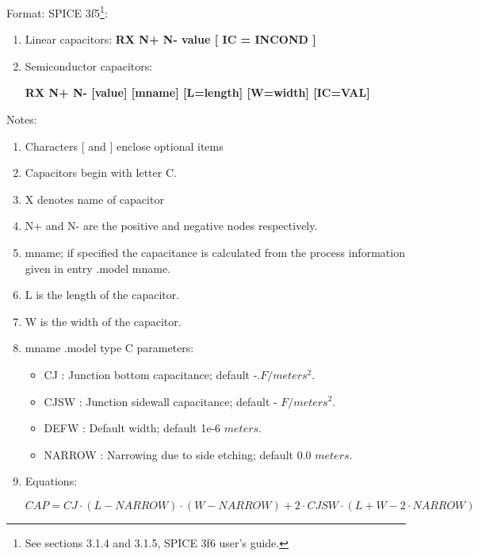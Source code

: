 \begin{flushleft}
Format: SPICE 3f5\footnote{See sections 3.1.4 and 3.1.5, SPICE 3f6 user's guide.}:
\begin{enumerate}
\item Linear capacitors: \textbf{RX N+ N- value [ IC = INCOND ]}
\item Semiconductor capacitors: 

\textbf{RX N+ N- [value] [mname] [L=length] [W=width] [IC=VAL]}                                                                                                                                                                                                                            \end{enumerate}
 \end{flushleft}

\begin{flushleft}
Notes: 
  \begin{enumerate}
   \item Characters [ and ] enclose optional items 
 \item Capacitors begin with letter C.
 \item X denotes name of capacitor
 \item N+ and N- are the positive and negative nodes respectively.
 \item mname; if specified the capacitance is calculated from the process information given in entry .model mname.
 \item L is the length of the capacitor.
 \item W is the width of the capacitor.
 \item mname .model type C parameters:
 \begin{itemize}
\item CJ     : Junction bottom capacitance; default -.$F / meters^{2}$.
\item CJSW   : Junction sidewall capacitance; default - $F / meters^{2}$.
\item DEFW   : Default width; default 1e-6 $meters$.
\item NARROW : Narrowing due to side etching; default 0.0 $meters$.
\end{itemize}

 
  \item Equations:
   \linebreak
   \begin{footnotesize}$CAP = CJ \cdot \left( L - NARROW \right) \cdot \left( W - NARROW\right) + 2 \cdot CJSW \cdot \left( L + W - 2 \cdot NARROW\right) $
\end{footnotesize}
  \end{enumerate}

\end{flushleft}



